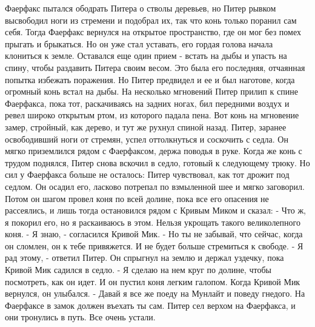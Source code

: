    Фаерфакс пытался ободрать Питера о стволы деревьев, но Питер 
рывком высвободил ноги из стремени и подобрал их, так что конь только 
поранил сам себя. Тогда Фаерфакс вернулся на открытое пространство, 
где он мог без помех прыгать и брыкаться. Но он уже стал уставать, его 
гордая голова начала клониться к земле. Оставался еще один прием - 
встать на дыбы и упасть на спину, чтобы раздавить Питера своим весом. 
Это была его последняя, отчаянная попытка избежать поражения.
    Но Питер предвидел и ее и был наготове, когда огромный конь встал 
на дыбы. На несколько мгновений Питер прилип к спине Фаерфакса, пока 
тот, раскачиваясь на задних ногах, бил передними воздух и ревел широко 
открытым ртом, из которого падала пена. Вот конь на мгновение замер, 
стройный, как дерево, и тут же рухнул спиной назад. Питер, заранее 
освободивший ноги от стремян, успел оттолкнуться и соскочить с седла. 
Он мягко приземлился рядом с Фаерфаксом, держа поводья в руке. Когда 
же конь с трудом поднялся, Питер снова вскочил в седло, готовый к 
следующему трюку.
    Но сил у Фаерфакса больше не осталось: Питер чувствовал, как тот 
дрожит под седлом. Он осадил его, ласково потрепал по взмыленной шее и 
мягко заговорил. Потом он шагом провел коня по всей долине, пока все 
его опасения не рассеялись, и лишь тогда остановился рядом с Кривым 
Миком и сказал:
    - Что ж, я покорил его, но я раскаиваюсь в этом. Нельзя укрощать 
такого великолепного коня.
    - Я знаю, - согласился Кривой Мик. - Но ты не забывай, что сейчас, 
когда он сломлен, он к тебе привяжется. И не будет больше стремиться к 
свободе.
    - Я рад этому, - ответил Питер.
    Он спрыгнул на землю и держал уздечку, пока Кривой Мик садился в 
седло.
    - Я сделаю на нем круг по долине, чтобы посмотреть, как он идет.
    И он пустил коня легким галопом. Когда Кривой Мик вернулся, он 
улыбался.
    - Давай я все же поеду на Мунлайт и поведу гнедого. На Фаерфаксе в 
замок должен въехать ты сам.
    Питер сел верхом на Фаерфакса, и они тронулись в путь. Все очень 
устали.
